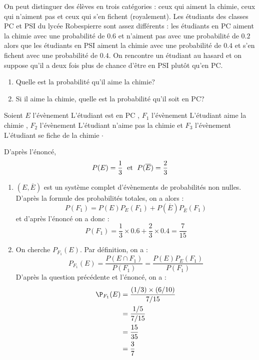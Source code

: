 \documentclass[a4paper,10pt]{report}
\begin{document}
\begin{Exa} On peut distinguer des élèves en trois catégories : ceux qui aiment la chimie, ceux qui n'aiment pas et ceux qui s'en fichent (royalement). Les étudiants des classes PC et PSI du lycée Robespierre sont assez différents : les étudiants en PC aiment la chimie avec une probabilité de $0.6$ et n'aiment pas avec une probabilité de $0.2$ alors que les étudiants en PSI aiment la chimie avec une probabilité de $0.4$ et s'en fichent avec une probabilité de $0.4$. On rencontre un étudiant au hasard et on suppose qu'il a deux fois plus de chance d'être en PSI plutôt qu'en PC.

\begin{enumerate}
\item Quelle est la probabilité qu'il aime la chimie?
\item Si il aime la chimie, quelle est la probabilité qu'il soit en PC?
\end{enumerate}
\end{Exa}

\corr Soient $E$ l'évènement \og L'étudiant est en PC \fg , $F_1$ l'évènement \og L'étudiant aime la chimie \fg , $F_2$ l'évènement \og L'étudiant n'aime pas la chimie \fg et $F_3$ l'évènement \og L'étudiant se fiche de la chimie \fg $\cdot$

\medskip

\noindent D'après l'énoncé,
$$ P(E) = \dfrac{1}{3} \; \hbox{ et } \; P(\overline{E}) = \dfrac{2}{3}$$
\begin{enumerate}
\item $(E, \overline{E})$ est un système complet d'évènements de probabilités non nulles. D'après la formule des probabilités totales, on a alors :
\[ P(F_1) = P(E) P_E(F_1) + P(\overline{E})P_{\overline{E}}(F_1) \]
et d'après l'énoncé on a donc :
\[ P(F_1) = \dfrac{1}{3} \times 0.6 + \dfrac{2}{3} \times 0.4 = \dfrac{7}{15} \]
\item On cherche $P_{F_1}(E)$. Par définition, on a :
\[ P_{F_1}(E) = \frac{P(E \cap F_1)}{P(F_1)} = \frac{P(E) P_E(F_1)}{P(F_1)} \]
D'après la question précédente et l'énoncé, on a :
\begin{align*}
\P_{F_1}(E) & = \frac{(1/3) \times (6/10)}{7/15} \\
& = \dfrac{1/5}{7/15} \\
& = \dfrac{15}{35} \\
& = \dfrac{3}{7}
\end{align*}
\end{enumerate}
\end{document}

